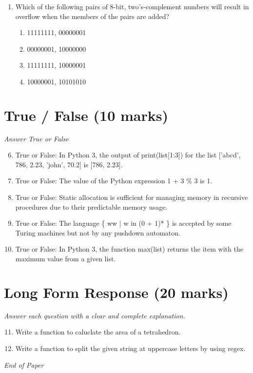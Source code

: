 \documentclass[12pt]{article}
\begin{document}
\begin{enumerate}[label=\arabic*.]
\begin{enumerate}[label=(\alph*)]
    \item 1
    \item 2
    \item 3
    \item 4
\end{enumerate}
\item Which of the following pairs of 8-bit, two's-complement numbers will result in overflow when the members of the pairs are added?
\begin{enumerate}[label=(\alph*)]
    \item 11111111, 00000001
    \item 00000001, 10000000
    \item 11111111, 10000001
    \item 10000001, 10101010
\end{enumerate}
\end{enumerate}

\section*{True / False (10 marks)}
\textit{Answer True or False}
\begin{enumerate}[label=\arabic*.]
\setcounter{enumi}{5}
\item True or False: In Python 3, the output of print(list[1:3]) for the list ['abcd', 786, 2.23, 'john', 70.2] is [786, 2.23].
\item True or False: The value of the Python expression 1 + 3 \% 3 is 1.
\item True or False: Static allocation is sufficient for managing memory in recursive procedures due to their predictable memory usage.
\item True or False: The language \{ ww | w in (0 + 1)* \} is accepted by some Turing machines but not by any pushdown automaton.
\item True or False: In Python 3, the function max(list) returns the item with the maximum value from a given list.
\end{enumerate}

\section*{Long Form Response (20 marks)}
\textit{Answer each question with a clear and complete explanation.}
\begin{enumerate}[label=\arabic*.]
\setcounter{enumi}{10}
\item Write a function to caluclate the area of a tetrahedron.
\item Write a function to split the given string at uppercase letters by using regex.
\end{enumerate}

\vfill
\noindent\textit{End of Paper}
\end{document}
